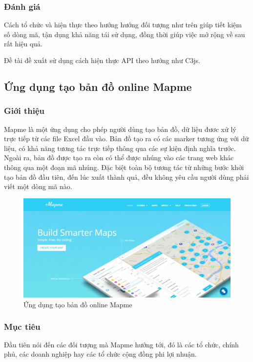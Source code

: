 \documentclass[12pt,a4paper,oneside]{article}
\begin{document}
\subsubsection{Đánh giá}
Cách tổ chức và hiện thực theo hướng hướng đối tượng như trên giúp tiết kiệm số dòng mã, tận dụng khả năng tái sử dụng, đồng thời giúp việc mở rộng về sau rất hiệu quả.

Đề tài đề xuất sử dụng cách hiện thực API theo hướng như C3js.

\subsection{Ứng dụng tạo bản đồ online Mapme}
\subsubsection{Giới thiệu}
Mapme là một ứng dụng cho phép người dùng tạo bản đồ, dữ liệu đươc xử lý trực tiếp từ các file Excel đầu vào. Bản đồ tạo ra có các marker tương ứng với dữ liệu, có khả năng tương tác trực tiếp thông qua các sự kiện định nghĩa trước. Ngoài ra, bản đồ được tạo ra còn có thể được nhúng vào các trang web khác thông qua một đoạn mã nhúng. Đặc biệt toàn bộ tương tác từ những bước khởi tạo bản đồ đầu tiên, đến lúc xuất thành quả, đều không yêu cầu người dùng phải viết một dòng mã nào.

\begin{figure}[htp]
    \includegraphics[scale=.4]{image/mapme}
    \caption{Ứng dụng tạo bản đồ online Mapme}
    \label{refhinh10}
\end{figure}

\subsubsection{Mục tiêu}
Đầu tiên nói đến các đối tượng mà Mapme hướng tới, đó là các tổ chức, chính phủ, các doanh nghiệp hay các tổ chức cộng đồng phi lợi nhuận.
\end{document}

